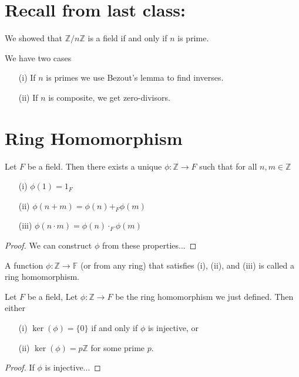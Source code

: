 
\section{Recall from last class:}
\begin{eg}
    We showed that \(\mathbb{Z} /n\mathbb{Z} \) is a field if and only if \(n\) is prime. 
\end{eg}
\begin{explanation}
    We have two cases
    \begin{itemize}
        \item[(i)] If \(n\) is primes we use Bezout's lemma to find inverses.
        \item[(ii)] If \(n\) is composite, we get zero-divisors. 
    \end{itemize}
\end{explanation}

\section{Ring Homomorphism}
\begin{lemma}
    Let \(F\) be a field. Then there exists a unique \(\phi \colon \mathbb{Z} \to F\) such that for all \(n,m \in \mathbb{Z} \)
    \begin{itemize}
        \item[(i)] \(\phi (1) = 1_F\)
        \item[(ii)] \(\phi (n+m) = \phi (n) +_F \phi (m)\)
        \item[(iii)] \(\phi (n\cdot m) = \phi (n) \cdot_F \phi (m)\)   
    \end{itemize}  
\end{lemma}
\begin{proof}
    We can construct \(\phi \) from these properties...
\end{proof}
\begin{note}
    A function \(\phi \colon \mathbb{Z} \to \mathbb{F} \) (or from any ring) that satisfies (i), (ii), and (iii) is called a ring homomorphism.
\end{note}

\begin{lemma}
    Let \(F\) be a field, Let \(\phi \colon \mathbb{Z} \to F \) be the ring homomorphism we just defined. Then either
    \begin{itemize}
        \item[(i)] \(\ker(\phi ) = \{ 0 \} \) if and only if \(\phi \) is injective, or
        \item[(ii)] \(\ker(\phi ) = p\mathbb{Z} \) for some prime \(p\).
    \end{itemize}
\end{lemma}
\begin{proof}
    If \(\phi \) is injective... 
\end{proof}

